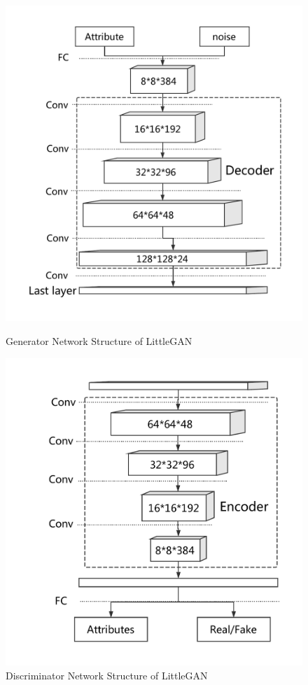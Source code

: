 \begin{figure}
    \begin{minipage}[t]{0.48\linewidth}
        \centering
        \includegraphics[width=\textwidth]{figures/net_generator.pdf}
        \caption{Generator Network Structure of LittleGAN}
        \label{net_generator}
    \end{minipage}
        \hfill
    \begin{minipage}[t]{0.48\linewidth}
        \centering
        \includegraphics[width=\textwidth]{figures/net_discriminator.pdf}
        \caption{Discriminator Network Structure of LittleGAN}
        \label{net_discriminator}
    \end{minipage}
\end{figure}
